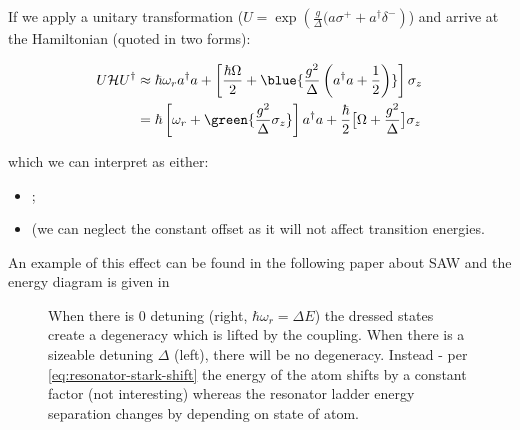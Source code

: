  \noindent     If    we     apply     a    unitary     transformation
 ($U = \exp \left(  \frac{g}{\Delta}(a\sigma^+ + a^{\dagger}\delta^{-} \right)$)
 and arrive at the Hamiltonian (quoted in two forms):

 \begin{equation}\label{eq:resonator-stark-shift}
   \begin{aligned}
     U\mathcal{H}U^{\dagger} & \approx \hbar\omega_ra^{\dag}a + \left[\frac{\hbar\Omega}{2} + \blue{\frac{g^{2}}{\Delta}\left( a^{\dagger}a + \frac{1}{2} \right)} \right]\sigma_z \\
     &   =   \hbar   \left[  \omega_r   +   \green{\frac{g^2}{\Delta}\sigma_z}
     \right]a^{\dagger} a + \frac{\hbar}{2}\big[\Omega + \frac{g^2}{\Delta}\big]\sigma_z
   \end{aligned}
 \end{equation}

 \noindent which we can interpret as either:
 \begin{itemize}
 \item  {};
 \item  {} (we can neglect the constant offset as it will not affect
   transition energies.
 \end{itemize}

 \noindent An  example of this effect  can be found in  the following
 paper about SAW \cite{Manenti_2017} and  the energy diagram is given
 in

\begin{figure}[h]
  \centering {}
  \caption{\small    When    there     is    0    detuning    (right,
    $\hbar\omega_{r}=\Delta   E$)  the   dressed   states  create   a
    degeneracy  which is  lifted by  the  coupling. When  there is  a
    sizeable   detuning   $\Delta$   (left),   there   will   be   no
    degeneracy. Instead -  per \autoref{eq:resonator-stark-shift} the
    energy of the atom shifts  by a constant factor (not interesting)
    whereas  the  resonator  ladder   energy  separation  changes  by
         depending     on    state     of
    atom. \label{fig:ac_stark_effect_dispersive_shift}}
\end{figure}

